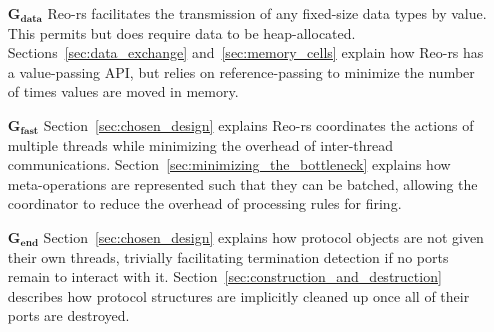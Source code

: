 \begin{enumerate}
	\item[$\boldsymbol{G_{data}}$] Reo-rs facilitates the transmission of any fixed-size data types by value. This permits but does require data to be heap-allocated. Sections~\ref{sec:data_exchange} and~\ref{sec:memory_cells} explain how Reo-rs has a value-passing API, but relies on reference-passing to minimize the number of times values are moved in memory.
	
	\item[$\boldsymbol{G_{fast}}$] Section~\ref{sec:chosen_design} explains Reo-rs coordinates the actions of multiple threads while minimizing the overhead of inter-thread communications. Section~\ref{sec:minimizing_the_bottleneck} explains how meta-operations are represented such that they can be batched, allowing the coordinator to reduce the overhead of processing rules for firing.
	
	\item[$\boldsymbol{G_{end}}$] Section~\ref{sec:chosen_design} explains how protocol objects are not given their own threads, trivially facilitating termination detection if no ports remain to interact with it. Section~\ref{sec:construction_and_destruction} describes how protocol structures are implicitly cleaned up once all of their ports are destroyed. 
\end{enumerate}